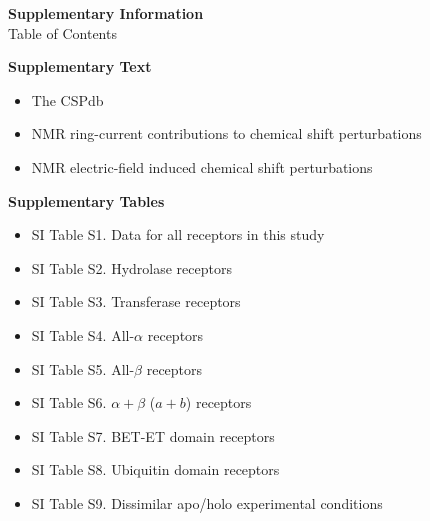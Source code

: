 \documentclass[11pt]{article}
\begin{document}
\begin{center}
{\LARGE\bfseries Supplementary Information}\\[0.6em]
{\large Table of Contents}
\end{center}
\vspace{0.8em}

\noindent\textbf{Supplementary Text}\\[0.3em]
\begin{itemize}[label={}]
\item The CSPdb
\item NMR ring-current contributions to chemical shift perturbations
\item NMR electric-field induced chemical shift perturbations
\end{itemize}

\vspace{0.6em}
\noindent\textbf{Supplementary Tables}\\[0.3em]
\begin{itemize}[label={}]
\item SI Table S1. Data for all receptors in this study
\item SI Table S2. Hydrolase receptors
\item SI Table S3. Transferase receptors
\item SI Table S4. All-$\alpha$ receptors
\item SI Table S5. All-$\beta$ receptors
\item SI Table S6. $\alpha+\beta$ ($a{+}b$) receptors
\item SI Table S7. BET-ET domain receptors
\item SI Table S8. Ubiquitin domain receptors
\item SI Table S9. Dissimilar apo/holo experimental conditions
\end{itemize}
\end{document}

